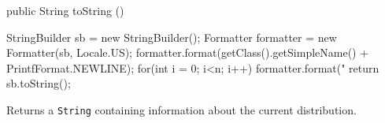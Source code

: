 \begin{code}

   public String toString ()\begin{hide} {
      StringBuilder sb = new StringBuilder();
      Formatter formatter = new Formatter(sb, Locale.US);
      formatter.format(getClass().getSimpleName() + PrintfFormat.NEWLINE);
      for(int i = 0; i<n; i++) {
         formatter.format("%
      }
      return sb.toString();
   }\end{hide}
\end{code}
\begin{tabb}
   Returns a \texttt{String} containing information about the current distribution.
\end{tabb}
\begin{code}\begin{hide}
}\end{hide}
\end{code}

